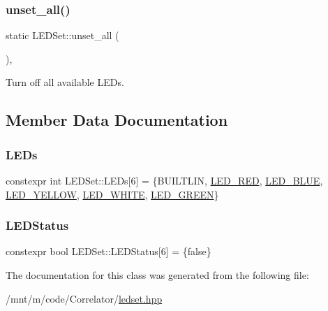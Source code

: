 \subsubsection{\texorpdfstring{unset\+\_\+all()}{unset\_all()}}
{\footnotesize\ttfamily static L\+E\+D\+Set\+::unset\+\_\+all (\begin{DoxyParamCaption}{ }\end{DoxyParamCaption})\hspace{0.3cm}{\ttfamily [inline]}, {\ttfamily [static]}}

Turn off all available L\+E\+Ds. 

\subsection{Member Data Documentation}
\mbox{\label{classLEDSet_a702b4369ddb5d8f4ca59056ebb6c4617}} 
\subsubsection{\texorpdfstring{L\+E\+Ds}{LEDs}}
{\footnotesize\ttfamily constexpr int L\+E\+D\+Set\+::\+L\+E\+Ds\mbox{[}6\mbox{]} = \{B\+U\+I\+L\+T\+L\+IN, \hyperlink{pins_8hpp_a735f426a390e22c0050b964328c5e06f}{L\+E\+D\+\_\+\+R\+ED}, \hyperlink{pins_8hpp_a8046eca6ddcbe578777cfde489622a13}{L\+E\+D\+\_\+\+B\+L\+UE}, \hyperlink{pins_8hpp_af338796c804fbfe2e9fd4d249e3c5004}{L\+E\+D\+\_\+\+Y\+E\+L\+L\+OW}, \hyperlink{pins_8hpp_a1be903f86639d50fb6ed02a0dbbe0e2c}{L\+E\+D\+\_\+\+W\+H\+I\+TE}, \hyperlink{pins_8hpp_a8d7df4222b2fde6205bebffc5a0ae070}{L\+E\+D\+\_\+\+G\+R\+E\+EN}\}\hspace{0.3cm}{\ttfamily [static]}}

\mbox{\label{classLEDSet_a9a38ca32395095475ed89e7eea01e990}} 
\subsubsection{\texorpdfstring{L\+E\+D\+Status}{LEDStatus}}
{\footnotesize\ttfamily constexpr bool L\+E\+D\+Set\+::\+L\+E\+D\+Status\mbox{[}6\mbox{]} = \{false\}\hspace{0.3cm}{\ttfamily [static]}}



The documentation for this class was generated from the following file\+:\begin{DoxyCompactItemize}
\item 
/mnt/m/code/\+Correlator/\hyperlink{ledset_8hpp}{ledset.\+hpp}\end{DoxyCompactItemize}
